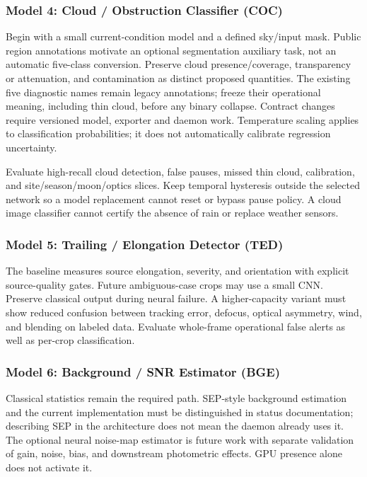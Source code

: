 \documentclass[11pt,a4paper]{article}
\begin{document}
\subsubsection{Model 4: Cloud / Obstruction Classifier (COC)}
Begin with a small current-condition model and a defined sky/input mask.
Public region annotations motivate an optional segmentation auxiliary task,
not an automatic five-class conversion. Preserve cloud presence/coverage,
transparency or attenuation, and contamination as distinct proposed quantities.
The existing five diagnostic names remain legacy annotations; freeze their
operational meaning, including thin cloud, before any binary collapse.
Contract changes require versioned model, exporter and daemon work. Temperature scaling applies to
classification probabilities; it does not automatically calibrate regression
uncertainty\cite{guo}.

Evaluate high-recall cloud detection, false pauses, missed thin cloud, calibration,
and site/season/moon/optics slices. Keep temporal hysteresis outside the selected
network so a model replacement cannot reset or bypass pause policy. A cloud
image classifier cannot certify the absence of rain or replace weather sensors.

\subsubsection{Model 5: Trailing / Elongation Detector (TED)}
The baseline measures source elongation, severity, and orientation with explicit
source-quality gates. Future ambiguous-case crops may use a small CNN. Preserve
classical output during neural failure. A higher-capacity variant must show
reduced confusion between tracking error, defocus, optical asymmetry, wind, and
blending on labeled data. Evaluate whole-frame operational false alerts as well
as per-crop classification.

\subsubsection{Model 6: Background / SNR Estimator (BGE)}
Classical statistics remain the required path. SEP-style background estimation
and the current implementation must be distinguished in status documentation;
describing SEP in the architecture does not mean the daemon already uses it.
The optional neural noise-map estimator is future work with separate validation
of gain, noise, bias, and downstream photometric effects. GPU presence alone
does not activate it.
\end{document}
